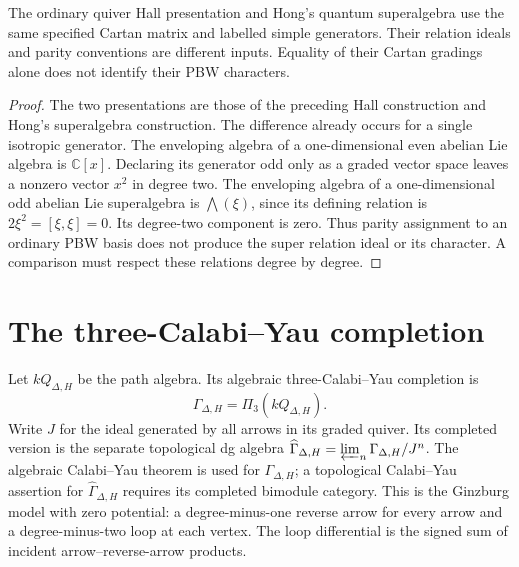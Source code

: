 \begin{theorem}
The ordinary quiver Hall presentation and Hong's quantum
superalgebra use the same specified Cartan matrix and labelled
simple generators. Their relation ideals and parity conventions
are different inputs. Equality of their Cartan gradings alone does
not identify their PBW characters.
\end{theorem}
\begin{proof}
The two presentations are those of the preceding Hall construction
and Hong's superalgebra construction. The difference already occurs
for a single isotropic generator. The enveloping algebra of a
one-dimensional even abelian Lie algebra is \(\mathbb C[x]\).
Declaring its generator odd only as a graded vector space leaves
a nonzero vector \(x^2\) in degree two. The enveloping algebra
of a one-dimensional odd abelian Lie superalgebra is
\(\bigwedge(\xi)\), since its defining relation is
\(2\xi^2=[\xi,\xi]=0\). Its degree-two component is zero.
Thus parity assignment to an ordinary PBW basis does not produce
the super relation ideal or its character. A comparison must
respect these relations degree by degree.
\end{proof}

\chapter{The three-Calabi--Yau completion}
Let $kQ_{\Delta,H}$ be the path algebra. Its algebraic
three-Calabi--Yau completion is
\[
 \Gamma_{\Delta,H}=\Pi_3(kQ_{\Delta,H}).
\]
Write $J$ for the ideal generated by all arrows in its graded quiver.
Its completed version is the separate topological dg algebra
$\widehat\Gamma_{\Delta,H}=\varprojlim_n\Gamma_{\Delta,H}/J^n$.
The algebraic Calabi--Yau theorem is used for $\Gamma_{\Delta,H}$;
a topological Calabi--Yau assertion for $\widehat\Gamma_{\Delta,H}$
requires its completed bimodule category.
This is the Ginzburg model with zero potential: a degree-minus-one
reverse arrow for every arrow and a degree-minus-two loop at each
vertex. The loop differential is the signed sum of incident
arrow--reverse-arrow products.

